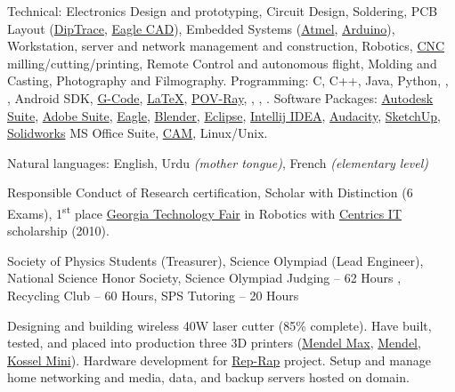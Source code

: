 \documentclass[10pt,a4paper]{article}
\begin{document}
\inlineheadsection  %
  {Technical:}
  {Electronics Design and prototyping, Circuit Design, Soldering, PCB Layout  (\href{http://diptrace.com/}{DipTrace}, \href{http://www.cadsoftusa.com/}{Eagle CAD}), Embedded Systems (\href{http://www.atmel.com/}{Atmel}, \href{http://www.arduino.cc/}{Arduino}), Workstation, server and network management and construction, Robotics, \href{http://en.wikipedia.org/wiki/Numerical_control}{CNC} milling/cutting/printing, Remote Control and autonomous flight, Molding and Casting, Photography and Filmography.
  }
  \vspace{0.5em}
  \inlineheadsection
  {Programming:}
  {C, C++, Java, Python, , , Android SDK, \href{http://en.wikipedia.org/wiki/G-code}{G-Code}, \href{http://www.latex-project.org}{\LaTeX}, \href{http://www.povray.org/}{POV-Ray}, , , .
  }
    \vspace{0.5em}
  \inlineheadsection
  {Software Packages:}
  {\href{http://www.autodesk.com/}{Autodesk Suite}, \href{http://www.adobe.com/}{Adobe Suite}, \href{http://www.cadsoftusa.com/}{Eagle}, \href{http://www.blender.org/}{Blender}, \href{https://www.eclipse.org/}{Eclipse}, \href{http://www.jetbrains.com/idea/}{Intellij IDEA}, \href{http://audacity.sourceforge.net/}{Audacity}, \href{http://www.sketchup.com/}{SketchUp}, \href{http://www.solidworks.com/}{Solidworks} MS Office Suite, \href{http://en.wikipedia.org/wiki/Computer-aided_manufacturing}{CAM}, Linux/Unix.}
  
\vspace{0.5em}
\inlineheadsection
  {Natural languages:}
  {English, Urdu \emph{(mother tongue)}, French \emph{(elementary level)}}

\spacedhrule{1.6em}{-0.4em}

  {\href{https://www.citiprogram.org/}{} Responsible Conduct of Research certification,  Scholar with Distinction (6 Exams), 1\textsuperscript{st} place \href{http://www.gatechfair.org/}{Georgia Technology Fair} in Robotics with \href{http://www.centricsit.com/}{Centrics IT} scholarship (2010).}
  
\spacedhrule{0.2em}{-0.4em}
  
	{Society of Physics Students (Treasurer), Science Olympiad (Lead Engineer), National Science Honor Society, Science Olympiad Judging -- 62 Hours , Recycling Club -- 60 Hours, SPS Tutoring -- 20 Hours}

\spacedhrule{0.2em}{-0.4em}

{Designing and building wireless 40W laser cutter (85\% complete). Have built, tested, and placed into production three 3D printers (\href{http://reprap.org/wiki/MendelMax}{Mendel Max}, \href{http://reprap.org/wiki/Mendel}{Mendel}, \href{http://reprap.org/wiki/Kossel}{Kossel Mini}). Hardware development for \href{http://reprap.org/wiki/RepRap}{Rep-Rap} project. Setup and manage home networking and media, data, and backup servers hosted on domain.}
\end{document}
